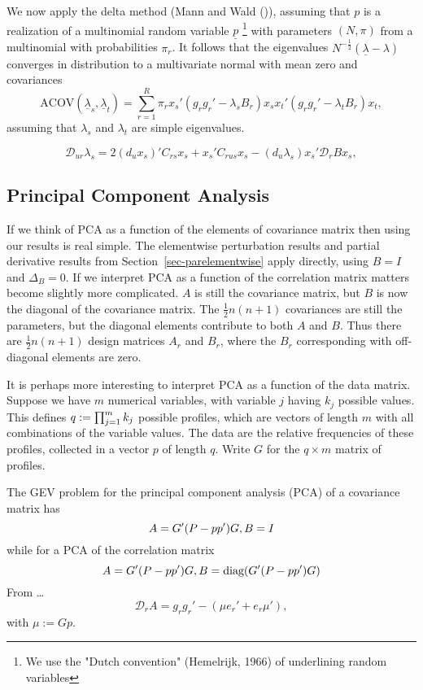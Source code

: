 \documentclass[
  12pt,
  letterpaper,
  DIV=11,
  numbers=noendperiod]{scrartcl}
\begin{document}
We now apply the delta method (Mann and Wald
()), assuming that \(p\) is a
realization of a multinomial random variable \(\underline{p}\)
\footnote{We use the "Dutch convention" 
(Hemelrijk, 1966) of underlining random variables} with parameters
\((N,\pi)\) from a multinomial with probabilities \(\pi_r\). It follows
that the eigenvalues \(N^{-\frac12}(\underline{\lambda}-\lambda)\)
converges in distribution to a multivariate normal with mean zero and
covariances \[
\text{ACOV}(\underline{\lambda}_s, \underline{\lambda}_t)=\sum_{r=1}^R\pi_rx_s'(g_rg_r'-\lambda_sB_r)x_sx_t'(g_rg_r'-\lambda_tB_r)x_t,
\] assuming that \(\lambda_s\) and \(\lambda_t\) are simple eigenvalues.

\begin{equation}
\mathcal{D}_{ur}\lambda_s=2(d_ux_s)'C_{rs}x_s+
x_s'C_{rus}x_s-(d_u\lambda_s)x_s'\mathcal{D}_rBx_s,
\label{eq-hosanna}
\end{equation}

\subsection{Principal Component Analysis}\label{sec-pca}

If we think of PCA as a function of the elements of covariance matrix
then using our results is real simple. The elementwise perturbation
results and partial derivative results from
Section~\ref{sec-parelementwise} apply directly, using \(B=I\) and
\(\Delta_B=0\). If we interpret PCA as a function of the correlation
matrix matters become slightly more complicated. \(A\) is still the
covariance matrix, but \(B\) is now the diagonal of the covariance
matrix. The \(\frac12n(n+1)\) covariances are still the parameters, but
the diagonal elements contribute to both \(A\) and \(B\). Thus there are
\(\frac12n(n+1)\) design matrices \(A_r\) and \(B_r\), where the \(B_r\)
corresponding with off-diagonal elements are zero.

It is perhaps more interesting to interpret PCA as a function of the
data matrix. Suppose we have \(m\) numerical variables, with variable
\(j\) having \(k_j\) possible values. This defines
\(q:=\smash{\prod_{j=1}^m k_j}\) possible profiles, which are vectors of
length \(m\) with all combinations of the variable values. The data are
the relative frequencies of these profiles, collected in a vector \(p\)
of length \(q\). Write \(G\) for the \(q\times m\) matrix of profiles.

The GEV problem for the principal component analysis (PCA) of a
covariance matrix has \[
A=G'(P-pp')G,\\
B=I
\] while for a PCA of the correlation matrix \[
A=G'(P-pp')G,\\
B=\text{diag}(G'(P-pp')G)
\] From \ldots{}\\
\[
\mathcal{D}_rA=g_rg_r'-(\mu e_r'+e_r\mu'),
\] with \(\mu:=Gp\).
\end{document}
